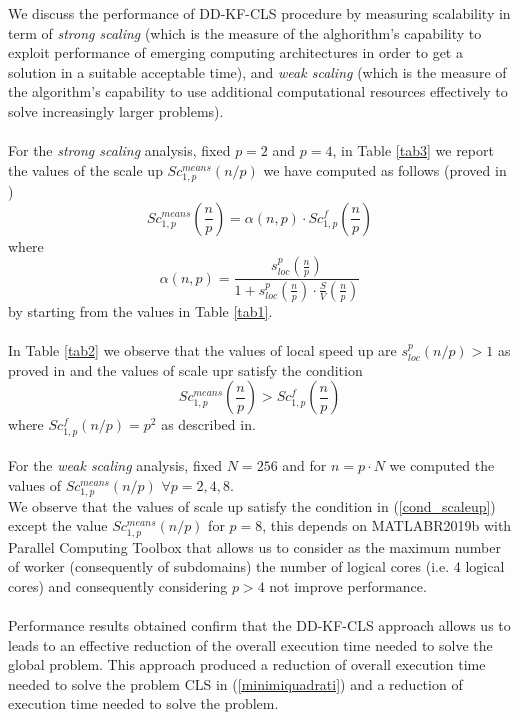 \documentclass{report}
\begin{document}
\noindent We discuss the performance of DD-KF-CLS procedure by measuring scalability in term of \textit{strong scaling} (which is the measure of the alghorithm's capability to exploit performance of emerging computing architectures in order to get a solution in a suitable acceptable time), and \textit{weak scaling} (which is the measure of the algorithm's capability to use additional computational resources effectively to solve increasingly larger problems).
\\
\\
\noindent For the \textit{strong scaling} analysis, fixed $p=2$ and $p=4$, in Table \ref{tab3} we report the values of the scale up $Sc_{1,p}^{means}\left({n}/{p}\right)$ we have computed as follows (proved in \cite{JPP})
\begin{equation}
Sc_{1,p}^{means}\left(\frac{n}{p}\right)=\alpha(n,p)\cdot Sc_{1,p}^{f}\left(\frac{n}{p}\right)
\end{equation}
where
\begin{equation}
\alpha(n,p)=\frac{s_{loc}^{p}\left(\frac{n}{p}\right)}{1+s_{loc}^{p}\left(\frac{n}{p}\right)\cdot \frac{S}{V}\left(\frac{n}{p}\right)}
\end{equation}
by starting from the values in Table \ref{tab1}.
\\
\\
In Table \ref{tab2} we observe that the values of local speed up are $s_{loc}^{p}({{n}/{p}})>1$ as proved in \cite{JPP} and the values of scale upr satisfy the condition
\begin{equation}\label{cond_scaleup}
Sc_{1,p}^{means}\left(\frac{n}{p}\right)>Sc_{1,p}^{f}\left(\frac{n}{p}\right)
\end{equation}
where $Sc_{1,p}^{f}\left({n}/{p}\right)=p^{2}$ as described in\cite{JSC}.
\\
\\
\noindent For the \textit{weak scaling} analysis, fixed $N=256$ and for $n=p\cdot N$ we computed the values of $Sc_{1,p}^{means}\left({n}/{p}\right)$  $\forall p=2,4,8$.\\ We observe that the values of scale up satisfy the condition in (\ref{cond_scaleup}) 
except the value $Sc_{1,p}^{means}\left({n}/{p}\right)$ for $p=8$, this depends on MATLABR2019b with Parallel Computing Toolbox that allows us to consider as the maximum number of worker (consequently of subdomains) the number of logical cores (i.e. 4 logical cores) and consequently considering $p>4$ not improve performance.
\\
\\
Performance results obtained confirm that the DD-KF-CLS approach allows us to leads to an effective reduction of the overall execution time needed to solve the global problem. This approach produced a reduction of overall execution time needed to solve the problem CLS in (\ref{minimiquadrati}) and a reduction of execution time needed to solve the problem. 
\\
\end{document}
